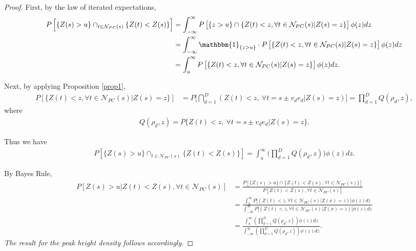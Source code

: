\documentclass{article}
\newcommand{\nt}[1]{\textit{\color{red} #1}}
\begin{document}
\begin{proof}
First, by the law of iterated expectations,
\begin{align*}
P\left[\{Z(s) > u\}\cap_{t\in\mathcal{N}_{PC}(s)}\{Z(t) < Z(s)\}\right]
&=\int_{-\infty}^{\infty}P\left[\{z>u\}\cap\{Z(t)<z, \forall t\in\mathcal{N}_{PC}(s)|Z(s)=z\}\right]\phi(z)dz\\
&=\int_{-\infty}^{\infty}\mathbbm{1}_{\{z>u\}}\cdot P\left[\{Z(t)<z, \forall t\in\mathcal{N}_{PC}(s)|Z(s)=z\}\right]\phi(z)dz\\
&=\int_{u}^{\infty}P\left[\{Z(t)<z, \forall t\in\mathcal{N}_{PC}(s)|Z(s)=z\}\right]\phi(z)dz.
\end{align*}

Next, by applying Proposition \ref{prop1}, 
\begin{align*}
P\left[\{Z(t)<z, \forall t\in\mathcal{N}_{PC}(s)|Z(s)=z\}\right] &= P\bigg[\bigcap_{d=1}^{D}(Z(t)<z,\ \forall t=s\pm v_de_d|Z(s)=z) \bigg]\nonumber = \prod_{d=1}^{D}Q(\rho_d,z),
\end{align*}
where
\begin{align*}
Q(\rho_d,z)=P\{Z(t)<z,\ \forall t=s\pm v_de_d |Z(s)=z\}.
\end{align*}

Thus we have
\begin{align*}
P\left[\{Z(s) > u\}\cap_{t\in\mathcal{N}_{PC}(s)}\{Z(t) < Z(s)\}\right]= \int_u^\infty\bigg(\prod_{d=1}^DQ(\rho_d,z)\bigg)\phi(z)dz.
\end{align*}

By Bayes Rule,
\begin{align*}
P [Z(s) > u|Z(t) < Z(s), \forall t \in \mathcal{N}_{PC}(s)] &= \frac{P[\{Z(s)> u\} \cap \{Z(t) < Z(s), \forall t \in \mathcal{N}_{PC}(s)\}]}{P[Z(t) < Z(s), \forall t \in \mathcal{N}_{PC}(s)]} \\&= \frac{\int_{u}^{\infty}P\big[(Z(t)<z, \forall t \in\mathcal{N}_{PC}(s)|Z(x)=z)\big]\phi(z)dz}{\int_{-\infty}^{\infty}P\big[(Z(t)<z, \forall t\in\mathcal{N}_{PC}(s)|Z(x)=z)\big]\phi(z)dz} \\&=\frac{\int_u^\infty\left(\prod_{d=1}^DQ(\rho_d,z)\right)\phi(z)dz}{\int_{-\infty}^\infty\left(\prod_{d=1}^DQ(\rho_d,z)\right)\phi(z)dz}.
\end{align*}
\nt{The result for the peak height density follows accordingly.}
\end{proof}
%
\end{document}
